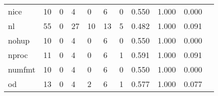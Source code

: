 \begin{longtable}{lp{1.20cm}p{1.20cm}p{1.20cm}p{1.20cm}p{1.20cm}p{1.20cm}p{1.20cm}p{1.20cm}p{1.20cm}p{1.20cm}}
nice      &                                    10 &                                                  0 &                                                  4 &                                                  0 &                                                  6 &                                                  0 &                                         0.550 &                                              1.000 &                                              0.000 \\
nl        &                                    55 &                                                  0 &                                                 27 &                                                 10 &                                                 13 &                                                  5 &                                         0.482 &                                              1.000 &                                              0.091 \\
nohup     &                                    10 &                                                  0 &                                                  4 &                                                  0 &                                                  6 &                                                  0 &                                         0.550 &                                              1.000 &                                              0.000 \\
nproc     &                                    11 &                                                  0 &                                                  4 &                                                  0 &                                                  6 &                                                  1 &                                         0.591 &                                              1.000 &                                              0.091 \\
numfmt    &                                    10 &                                                  0 &                                                  4 &                                                  0 &                                                  6 &                                                  0 &                                         0.550 &                                              1.000 &                                              0.000 \\
od        &                                    13 &                                                  0 &                                                  4 &                                                  2 &                                                  6 &                                                  1 &                                         0.577 &                                              1.000 &                                              0.077 \\

\end{longtable}

